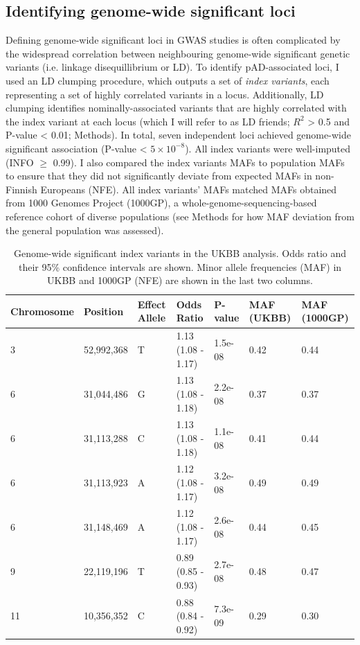   \subsection{Identifying genome-wide significant loci}
  Defining genome-wide significant loci in GWAS studies is often complicated by the widespread correlation between neighbouring genome-wide significant genetic variants (i.e. linkage disequillibrium or LD). To identify pAD-associated loci, I used an LD clumping procedure, which outputs a set of \textit{index variants}, each representing a set of highly correlated variants in a locus. Additionally, LD clumping identifies nominally-associated variants that are highly correlated with the index variant at each locus (which I will refer to as LD friends; $R^{2}$ > 0.5 and P-value < 0.01; Methods). In total, seven independent loci achieved genome-wide significant association (P-value < $5\times10^{-8}$). All index variants were well-imputed (INFO $\geq$ 0.99). I also compared the index variants MAFs to population MAFs to ensure that they did not significantly deviate from expected MAFs in non-Finnish Europeans (NFE). All index variants' MAFs matched MAFs obtained from 1000 Genomes Project (1000GP), a whole-genome-sequencing-based reference cohort of diverse populations (see Methods for how MAF deviation from the general population was assessed). 

  \begin{table}[htb]
    \centering\begingroup\fontsize{10}{14}\selectfont
    \caption{Genome-wide significant index variants in the UKBB analysis. Odds ratio and their 95\% confidence intervals are shown. Minor allele frequencies (MAF) in UKBB and 1000GP (NFE) are shown in the last two columns.}
    \label{table:gws}
    \begin{tabular}[t]{|l|l|l|l|l|l|l|}
      \hline
      Chromosome & Position & Effect Allele & Odds Ratio & P-value & MAF (UKBB) & MAF (1000GP)\\
      \hline
      3 & 52,992,368 & T & 1.13 (1.08 - 1.17) & 1.5e-08 & 0.42 & 0.44\\
      \hline
      6 & 31,044,486 & G & 1.13 (1.08 - 1.18) & 2.2e-08 & 0.37 & 0.37\\
      \hline
      6 & 31,113,288 & C & 1.13 (1.08 - 1.18) & 1.1e-08 & 0.41 & 0.44\\
      \hline
      6 & 31,113,923 & A & 1.12 (1.08 - 1.17) & 3.2e-08 & 0.49 & 0.49\\
      \hline
      6 & 31,148,469 & A & 1.12 (1.08 - 1.17) & 2.6e-08 & 0.44 & 0.45\\
      \hline
      9 & 22,119,196 & T & 0.89 (0.85 - 0.93) & 2.7e-08 & 0.48 & 0.47\\
      \hline
      11 & 10,356,352 & C & 0.88 (0.84 - 0.92) & 7.3e-09 & 0.29 & 0.30\\
      \hline
      \end{tabular}

    \endgroup{}

    \end{table}

